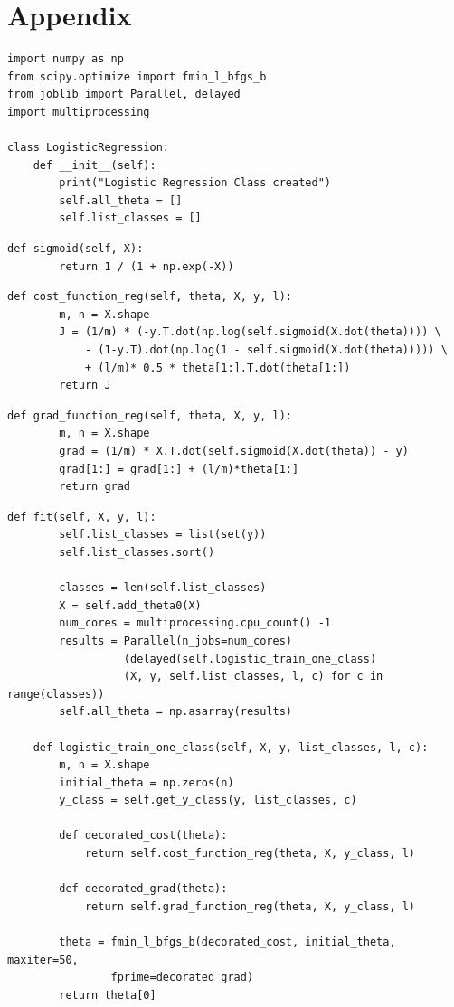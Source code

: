 \documentclass[letterpaper,10pt]{article}
\theoremstyle{mytheor}
\begin{document}
\section{Appendix}
\begin{lstlisting}[label={list:first},caption=Class Definition]
import numpy as np
from scipy.optimize import fmin_l_bfgs_b
from joblib import Parallel, delayed
import multiprocessing

class LogisticRegression:
    def __init__(self):
        print("Logistic Regression Class created")
        self.all_theta = []
        self.list_classes = []
\end{lstlisting}

\begin{lstlisting}[label={list:second},caption=Sigmoid Function]
	def sigmoid(self, X):
		return 1 / (1 + np.exp(-X))
\end{lstlisting}

\begin{lstlisting}[label={list:third},caption=Cost Function]
	def cost_function_reg(self, theta, X, y, l):
        m, n = X.shape
        J = (1/m) * (-y.T.dot(np.log(self.sigmoid(X.dot(theta)))) \ 
        	- (1-y.T).dot(np.log(1 - self.sigmoid(X.dot(theta))))) \
            + (l/m)* 0.5 * theta[1:].T.dot(theta[1:])
        return J
\end{lstlisting}

\begin{lstlisting}[label={list:fourth},caption=Gradient Function]
    def grad_function_reg(self, theta, X, y, l):
        m, n = X.shape
        grad = (1/m) * X.T.dot(self.sigmoid(X.dot(theta)) - y)
        grad[1:] = grad[1:] + (l/m)*theta[1:]
        return grad
\end{lstlisting}

\begin{lstlisting}[label={list:fifth},caption=Training Process]
    def fit(self, X, y, l):
        self.list_classes = list(set(y))
        self.list_classes.sort()

        classes = len(self.list_classes)
        X = self.add_theta0(X)
        num_cores = multiprocessing.cpu_count() -1
        results = Parallel(n_jobs=num_cores) 
        		  (delayed(self.logistic_train_one_class)
        		  (X, y, self.list_classes, l, c) for c in range(classes))
        self.all_theta = np.asarray(results)

    def logistic_train_one_class(self, X, y, list_classes, l, c):
        m, n = X.shape
        initial_theta = np.zeros(n)
        y_class = self.get_y_class(y, list_classes, c)

        def decorated_cost(theta):
            return self.cost_function_reg(theta, X, y_class, l)

        def decorated_grad(theta):
            return self.grad_function_reg(theta, X, y_class, l)

        theta = fmin_l_bfgs_b(decorated_cost, initial_theta, maxiter=50, 
                fprime=decorated_grad)
        return theta[0]
\end{lstlisting}
\end{document}
